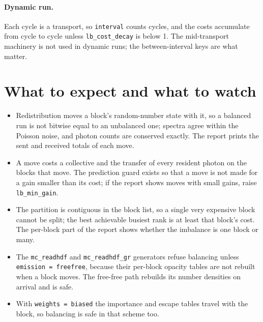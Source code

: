 \documentclass[11pt]{article}
\newcommand{\key}[1]{\texttt{#1}}
\begin{document}
\paragraph{Dynamic run.}
Each cycle is a transport, so \key{interval} counts cycles, and the costs accumulate
from cycle to cycle unless \key{lb\_cost\_decay} is below 1. The mid-transport
machinery is not used in dynamic runs; the between-interval keys are what matter.

\section{What to expect and what to watch}

\begin{itemize}
  \item Redistribution moves a block's random-number state with it, so a balanced run
    is not bitwise equal to an unbalanced one; spectra agree within the Poisson noise,
    and photon counts are conserved exactly. The report prints the sent and received
    totals of each move.
  \item A move costs a collective and the transfer of every resident photon on the
    blocks that move. The prediction guard exists so that a move is not made for a
    gain smaller than its cost; if the report shows moves with small gains,
    raise \key{lb\_min\_gain}.
  \item The partition is contiguous in the block list, so a single very expensive block
    cannot be split; the best achievable busiest rank is at least that block's cost.
    The per-block part of the report shows whether the imbalance is one block or many.
  \item The \key{mc\_readhdf} and \key{mc\_readhdf\_gr} generators refuse balancing
    unless \key{emission = freefree}, because their per-block opacity tables are not
    rebuilt when a block moves. The free-free path rebuilds its number densities on
    arrival and is safe.
  \item With \key{weights = biased} the importance and escape tables travel with the
    block, so balancing is safe in that scheme too.
\end{itemize}
\end{document}
